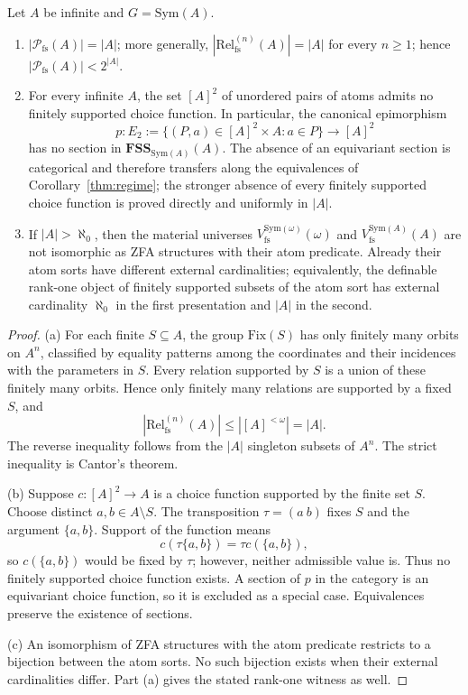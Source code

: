 \documentclass{lmcs}
\newcommand{\Sym}{\mathrm{Sym}}
\newcommand{\Fix}{\mathrm{Fix}}
\newcommand{\Rel}{\mathrm{Rel}}
\newcommand{\fs}{\mathrm{fs}}
\newcommand{\FSS}{\mathbf{FSS}}
\newcommand{\Pfs}{\mathcal{P}_{\fs}}
\newcommand{\Vfs}{V_{\fs}}
\begin{document}
\begin{thm}\label{thm:material}
Let $A$ be infinite and $G=\Sym(A)$.
\begin{enumerate}[label=\textup{(\alph*)}]
\item $|\Pfs(A)|=|A|$; more generally,
$|\Rel^{(n)}_{\fs}(A)|=|A|$ for every $n\geq1$; hence
$|\Pfs(A)|<2^{|A|}$.
\item For every infinite $A$, the set $[A]^2$ of unordered pairs of
atoms admits no finitely supported choice function. In particular,
the canonical epimorphism
\[
 p:E_2:=\{(P,a)\in[A]^2\times A:a\in P\}\longrightarrow[A]^2
\]
has no section in $\FSS_{\Sym(A)}(A)$. The absence of an equivariant
section is categorical and therefore transfers along the equivalences
of Corollary~\ref{thm:regime}; the stronger absence of every finitely
supported choice function is proved directly and uniformly in $|A|$.
\item If $|A|>\aleph_0$, then the material universes
$\Vfs^{\Sym(\omega)}(\omega)$ and $\Vfs^{\Sym(A)}(A)$ are not
isomorphic as ZFA structures with their atom predicate. Already their
atom sorts have different external cardinalities; equivalently, the
definable rank-one object of finitely supported subsets of the atom
sort has external cardinality $\aleph_0$ in the first presentation and
$|A|$ in the second.
\end{enumerate}
\end{thm}

\begin{proof}
(a) For each finite $S\subseteq A$, the group $\Fix(S)$ has only
finitely many orbits on $A^n$, classified by equality patterns among
the coordinates and their incidences with the parameters in $S$.
Every relation supported by $S$ is a union of these finitely many
orbits. Hence only finitely many relations are supported by a fixed
$S$, and
\[
  |\Rel^{(n)}_{\fs}(A)|\leq |[A]^{<\omega}|=|A|.
\]
The reverse inequality follows from the $|A|$ singleton subsets of
$A^n$. The strict inequality is Cantor's theorem.

(b) Suppose $c:[A]^2\to A$ is a choice function supported by the
finite set $S$. Choose distinct $a,b\in A\setminus S$. The
transposition $\tau=(a\ b)$ fixes $S$ and the argument $\{a,b\}$.
Support of the function means
\[
  c(\tau\{a,b\})=\tau c(\{a,b\}),
\]
so $c(\{a,b\})$ would be fixed by $\tau$; however, neither admissible value is. Thus no finitely supported choice function exists. A section of $p$
in the category is an equivariant choice function, so it is excluded as
a special case. Equivalences preserve the existence of sections.

(c) An isomorphism of ZFA structures with the atom predicate restricts
to a bijection between the atom sorts. No such bijection exists when
their external cardinalities differ. Part (a) gives the stated
rank-one witness as well.
\end{proof}
\end{document}
